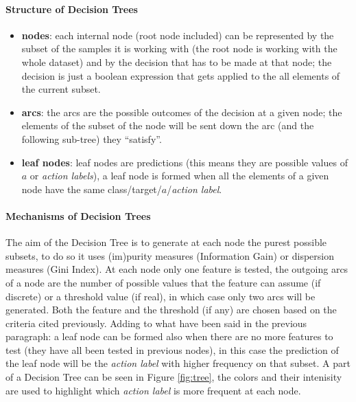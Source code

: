 \paragraph{Structure of Decision Trees}
\begin{itemize}
 \item \textbf{nodes}: each internal node (root node included) can be represented by the subset of the samples it is working with (the root node is working with the whole dataset) and by the decision that has to be made at that node; the decision is just a boolean expression that gets applied to the all elements of the current subset. 
 \item \textbf{arcs}: the arcs are the possible outcomes of the decision at a given node; the elements of the subset of the node will be sent down the arc (and the following sub-tree) they ``satisfy''.
 \item \textbf{leaf nodes}: leaf nodes are predictions (this means they are possible values of $a$ or \textit{action labels}), a leaf node is formed when all the elements of a given node have the same class/target/$a$/\textit{action label}.
\end{itemize}

\paragraph{Mechanisms of Decision Trees}
The aim of the Decision Tree is to generate at each node the purest possible subsets, to do so it uses (im)purity measures (Information Gain) or dispersion measures (Gini Index). At each node only one feature is tested, the outgoing arcs of a node are the number of possible values that the feature can assume (if discrete) or a threshold value (if real), in which case only two arcs will be generated. Both the feature and the threshold (if any) are chosen based on the criteria cited previously. Adding to what have been said in the previous paragraph: a leaf node can be formed also when there are no more features to test (they have all been tested in previous nodes), in this case the prediction of the leaf node will be the \textit{action label} with higher frequency on that subset. A part of a Decision Tree can be seen in Figure \ref{fig:tree}, the colors and their intenisity are used to highlight which \textit{action label} is more frequent at each node.

